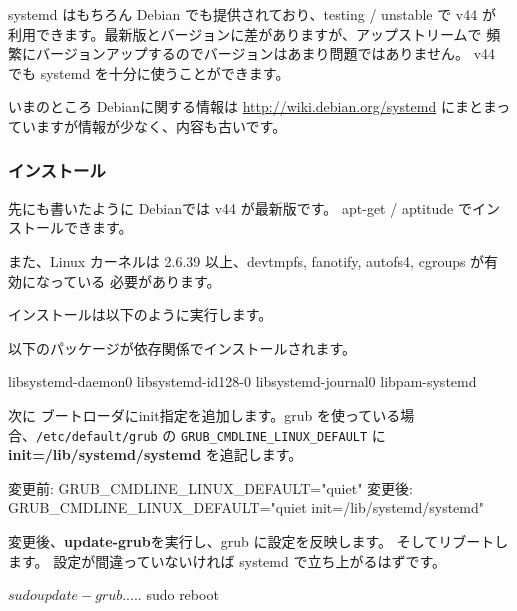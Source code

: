 \documentclass[mingoth,a4paper]{jsarticle}
\begin{document}
systemd はもちろん Debian でも提供されており、testing / unstable で v44 が
利用できます。最新版とバージョンに差がありますが、アップストリームで
頻繁にバージョンアップするのでバージョンはあまり問題ではありません。
v44 でも systemd を十分に使うことができます。

いまのところ Debianに関する情報は \url{http://wiki.debian.org/systemd}
にまとまっていますが情報が少なく、内容も古いです。

\subsubsection{インストール}
先にも書いたように Debianでは v44 が最新版です。
apt-get / aptitude でインストールできます。

また、Linux カーネルは 2.6.39 以上、devtmpfs, fanotify, autofs4, cgroups が有効になっている
必要があります。


インストールは以下のように実行します。


以下のパッケージが依存関係でインストールされます。
\begin{commandline}
libsystemd-daemon0
libsystemd-id128-0
libsystemd-journal0
libpam-systemd
\end{commandline}

次に ブートローダにinit指定を追加します。grub を使っている場合、\texttt{/etc/default/grub} の
\texttt{GRUB\_CMDLINE\_LINUX\_DEFAULT} に {\bf init=/lib/systemd/systemd} を追記します。 

\begin{commandline}
変更前:
GRUB_CMDLINE_LINUX_DEFAULT="quiet"
変更後:
GRUB_CMDLINE_LINUX_DEFAULT="quiet init=/lib/systemd/systemd"
\end{commandline} 

変更後、{\bf update-grub}を実行し、grub に設定を反映します。
そしてリブートします。
設定が間違っていないければ systemd で立ち上がるはずです。

\begin{commandline}
$ sudo update-grub
.....
$ sudo reboot 
\end{commandline}
\end{document}
